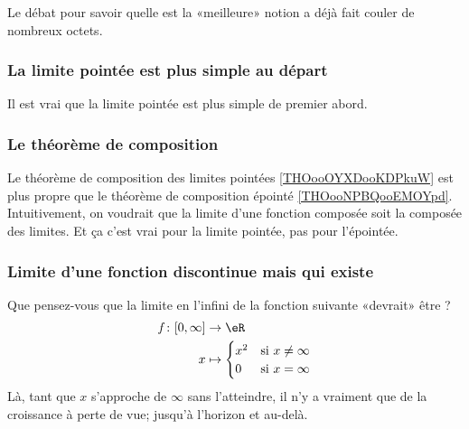 Le débat pour savoir quelle est la «meilleure» notion a déjà fait couler de nombreux octets\cite{BIBooKNWHooBRoxme,BIBooNUKAooVMqppa,BIBooDILKooUcmUVD,BIBooJDPPooVONaQV,BIBooUIAFooHqKjQh}.


\subsubsection{La limite pointée est plus simple au départ}

Il est vrai que la limite pointée est plus simple de premier abord.

\subsubsection{Le théorème de composition}

Le théorème de composition des limites pointées \ref{THOooOYXDooKDPkuW} est plus propre que le théorème de composition épointé \ref{THOooNPBQooEMOYpd}. Intuitivement, on voudrait que la limite d'une fonction composée soit la composée des limites. Et ça c'est vrai pour la limite pointée, pas pour l'épointée.

\subsubsection{Limite d'une fonction discontinue mais qui existe}

Que pensez-vous que la limite en l'infini de la fonction suivante «devrait» être ?
\begin{equation}
	\begin{aligned}
		f\colon \mathopen[ 0 , \infty \mathclose] & \to \eR                            \\
		x                                         & \mapsto \begin{cases}
			x^2 & \text{si } x\neq \infty \\
			0   & \text{si }x=\infty
		\end{cases}
	\end{aligned}
\end{equation}
Là, tant que \( x\) s'approche de \( \infty\) sans l'atteindre, il n'y a vraiment que de la croissance à perte de vue; jusqu'à l'horizon et au-delà.

